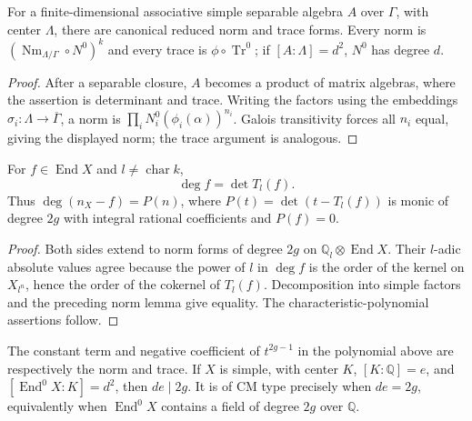 \begin{lemma}
\label{mumford-lem-reduced-norm-simple-algebra}
For a finite-dimensional associative simple separable algebra $A$ over
$\Gamma$, with center $\Lambda$, there are canonical reduced norm and trace
forms. Every norm is
$(\operatorname{Nm}_{\Lambda/\Gamma}\circ N^0)^k$ and every trace is
$\phi\circ\operatorname{Tr}^0$; if $[A:\Lambda]=d^2$, $N^0$ has degree $d$.
\end{lemma}
\begin{proof}
After a separable closure, $A$ becomes a product of matrix algebras, where
the assertion is determinant and trace. Writing the factors using the
embeddings $\sigma_i:\Lambda\to\overline\Gamma$, a norm is
$\prod_iN_i^0(\phi_i(\alpha))^{n_i}$. Galois transitivity forces all
$n_i$ equal, giving the displayed norm; the trace argument is analogous.
\end{proof}

\begin{theorem}
\label{mumford-thm-degree-tate-determinant}
For $f\in\operatorname{End}X$ and $l\ne\operatorname{char}k$,
\[
\deg f=\det T_l(f).
\]
Thus $\deg(n_X-f)=P(n)$, where $P(t)=\det(t-T_l(f))$ is monic of degree
$2g$ with integral rational coefficients and $P(f)=0$.
\end{theorem}
\begin{proof}
Both sides extend to norm forms of degree $2g$ on
$\mathbb Q_l\otimes\operatorname{End}X$. Their $l$-adic absolute values
agree because the power of $l$ in $\deg f$ is the order of the kernel on
$X_{l^n}$, hence the order of the cokernel of $T_l(f)$. Decomposition into
simple factors and the preceding norm lemma give equality. The
characteristic-polynomial assertions follow.
\end{proof}

\begin{remark}
\label{mumford-rem-endomorphism-characteristic}
The constant term and negative coefficient of $t^{2g-1}$ in the polynomial
above are respectively the norm and trace. If $X$ is simple, with center
$K$, $[K:\mathbb Q]=e$, and $[\operatorname{End}^0X:K]=d^2$, then $de\mid2g$.
It is of CM type precisely when $de=2g$, equivalently when
$\operatorname{End}^0X$ contains a field of degree $2g$ over $\mathbb Q$.
\end{remark}

